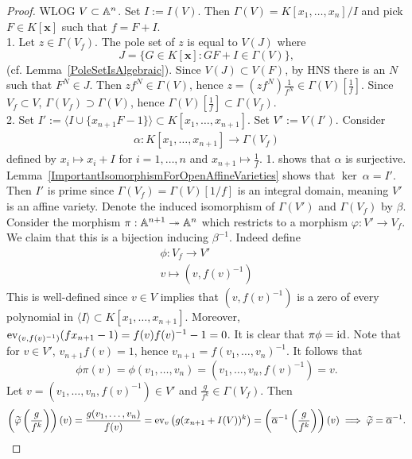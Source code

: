     \begin{proof}
        WLOG $V\subset \mathbb{A}^n$. Set $I:= I(V)$. Then $\Gamma(V) = K[x_1,\dots,x_n]/I$ and pick $F\in K[\mathbf{x}]$ such that $f=F+I$.\\
        1. Let $z\in \Gamma(V_f)$. The pole set of $z$ is equal to $V(J)$ where $$J= \{ G\in K[\mathbf{x}] : GF+I\in \Gamma(V)\},$$
        (cf. Lemma~\ref{PoleSetIsAlgebraic}). Since $V(J)\subset V(F)$, by HNS there is an $N$ such that $F^N\in J$. Then $zf^N\in \Gamma(V)$, hence $z=(zf^N)\frac{1}{f^N}\in \Gamma(V)\left[\frac{1}{f}\right]$. Since $V_f\subset V$, $\Gamma(V_f)\supset \Gamma(V)$, hence $\Gamma(V)\left[\frac{1}{f}\right]\subset \Gamma(V_f)$.\\
        2. Set $I' := \langle I\cup \{x_{n+1}F-1\}\rangle\subset K[x_1,\dots,x_{n+1}]$. Set $V' := V(I')$. Consider 
        \begin{gather*}
            \alpha : K[x_1,\dots,x_{n+1}] \rightarrow \Gamma(V_f)
        \end{gather*}
        defined by $x_i \mapsto x_i+I$ for $i=1,\dots,n$ and $x_{n+1}\mapsto \frac{1}{f}$. 1. shows that $\alpha$ is surjective. Lemma~\ref{ImportantIsomorphismForOpenAffineVarieties} shows that $\ker\ \alpha = I'$. Then $I'$ is prime since $\Gamma(V_f)=\Gamma(V)[1/f]$ is an integral domain, meaning $V'$ is an affine variety. Denote the induced isomorphism of $\Gamma(V')$ and $\Gamma(V_f)$ by $\beta$. Consider the morphism $\pi : \mathbb{A}^{n+1}\twoheadrightarrow \mathbb{A}^n$ which restricts to a morphism $\varphi: V' \rightarrow V_f$. We claim that this is a bijection inducing $\beta^{-1}$. Indeed define 
        \begin{gather*}
            \phi: V_f\rightarrow V'\\
            v\mapsto (v,f(v)^{-1})
        \end{gather*}
        This is well-defined since $v\in V$ implies that $(v,f(v)^{-1})$ is a zero of every polynomial in $\langle I\rangle \subset K[x_1,\dots,x_{n+1}]$. Moreover, $\mathrm{ev}_{(v,f(v)^{-1})}(fx_{n+1}-1)= f(v)f(v)^{-1}-1=0$. It is clear that $\pi\phi=\mathrm{id}$. Note that for $v\in V'$, $v_{n+1}f(v)=1$, hence $v_{n+1}=f(v_1,\dots,v_n)^{-1}$. It follows that 
        $$\phi\pi(v)=\phi(v_1,\dots,v_n)=(v_1,\dots,v_n,f(v)^{-1}) =v.$$
        Let $v=(v_1,\dots,v_n,f(v)^{-1})\in V'$ and $\frac{g}{f^k}\in \Gamma(V_f)$. Then 
        \begin{align*}
            \left(\widetilde{\varphi}\left(\frac{g}{f^k}\right)\right)(v)= \frac{g(v_1,\dots,v_n)}{f(v)}= \ev_v\left(g(x_{n+1}+I(V))^k\right) = \left(\overline{\alpha}^{-1}\left(\frac{g}{f^k}\right)\right)(v) \implies \widetilde{\varphi} = \overline{\alpha}^{-1}. 

\end{align*}
\end{proof}
